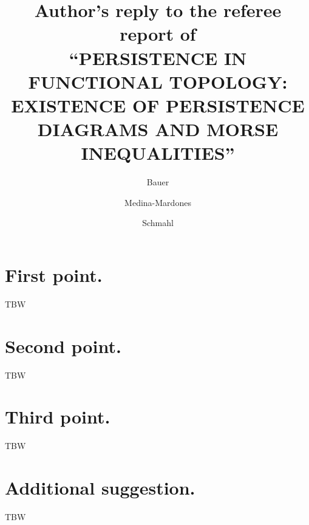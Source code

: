 \documentclass{article}
\title{Author's reply to the referee report of \\ \textsc{
    ``PERSISTENCE IN FUNCTIONAL TOPOLOGY: EXISTENCE OF PERSISTENCE DIAGRAMS AND MORSE INEQUALITIES''
    }
}
\author{Bauer \and Medina-Mardones \and Schmahl}
\begin{document}
	\maketitle
	\section{First point.} TBW

	\section{Second point.} TBW

	\section{Third point.} TBW

	\section{Additional suggestion.} TBW
\end{document}
